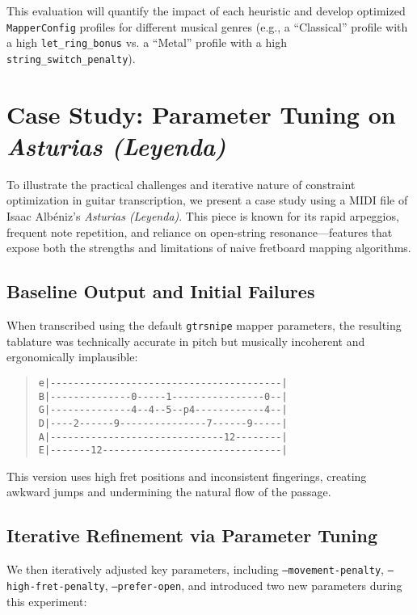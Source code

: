 \documentclass[conference]{IEEEtran}
\begin{document}
This evaluation will quantify the impact of each heuristic and develop optimized \texttt{MapperConfig} profiles for different musical genres (e.g., a ``Classical'' profile with a high \texttt{let\_ring\_bonus} vs. a ``Metal'' profile with a high \texttt{string\_switch\_penalty}).

\section{Case Study: Parameter Tuning on \emph{Asturias (Leyenda)}}

To illustrate the practical challenges and iterative nature of constraint optimization in guitar transcription, we present a case study using a MIDI file of Isaac Albéniz’s \emph{Asturias (Leyenda)}. This piece is known for its rapid arpeggios, frequent note repetition, and reliance on open-string resonance—features that expose both the strengths and limitations of naive fretboard mapping algorithms.

\subsection{Baseline Output and Initial Failures}

When transcribed using the default \texttt{gtrsnipe} mapper parameters, the resulting tablature was technically accurate in pitch but musically incoherent and ergonomically implausible:

\begin{quote}\small
\begin{verbatim}
e|----------------------------------------|
B|--------------0-----1----------------0--|
G|--------------4--4--5--p4------------4--|
D|----2------9---------------7------9-----|
A|------------------------------12--------|
E|-------12-------------------------------|
\end{verbatim}
\end{quote}

This version uses high fret positions and inconsistent fingerings, creating awkward jumps and undermining the natural flow of the passage.

\subsection{Iterative Refinement via Parameter Tuning}

We then iteratively adjusted key parameters, including \texttt{--movement-penalty}, \texttt{--high-fret-penalty}, \texttt{--prefer-open}, and introduced two new parameters during this experiment:
\end{document}
